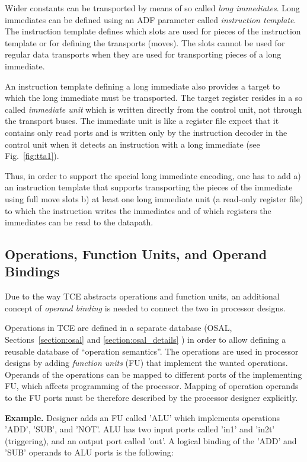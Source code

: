 \documentclass[a4paper,twoside]{tceusermanual}
\begin{document}
Wider constants can be transported by means of so called \textit{long
  immediates}. Long immediates can be defined using an ADF parameter
called \textit{instruction template}. The instruction template defines
which slots are used for pieces of the instruction template or for
defining the transports (moves).  The slots cannot be used for regular
data transports when they are used for transporting pieces of a long
immediate.

An instruction template defining a long immediate also provides
a target to which the long immediate must be transported. The target register
resides in a so called \textit{immediate unit} which is written directly 
from the control unit, not through the transport buses. The immediate unit is like
a register file expect that it contains only read ports and is written
only by the instruction decoder in the control unit when it detects an 
instruction with a long immediate (see Fig.~\ref{fig:tta1}).

Thus, in order to support the special long immediate encoding, one has
to add a) an instruction template that supports transporting the pieces
of the immediate using full move slots b) at least one long immediate
unit (a read-only register file) to which the instruction writes the
immediates and of which registers the immediates can be read to the
datapath.

\subsection{Operations, Function Units, and Operand Bindings}
Due to the way TCE abstracts operations and function units, an
additional concept of \textit{operand binding} is needed to 
connect the two in processor designs.

Operations in TCE are defined in a separate database (OSAL,
Sections~\ref{section:osal} and \ref{section:osal_details} ) in order
to allow defining a reusable database of ``operation semantics''. The
operations are used in processor designs by adding \textit{function
units} (FU) that implement the wanted operations. Operands of the
operations can be mapped to different ports of the implementing FU,
which affects programming of the processor. Mapping of operation
operands to the FU ports must be therefore described by the processor
designer explicitly.

\textbf{Example.} Designer adds an FU called 'ALU' which implements
operations 'ADD', 'SUB', and 'NOT'. ALU has two input ports called 'in1' and 
'in2t' (triggering), and an output port called 'out'. A logical binding of 
the 'ADD' and 'SUB' operands to ALU ports is the following:
\end{document}
